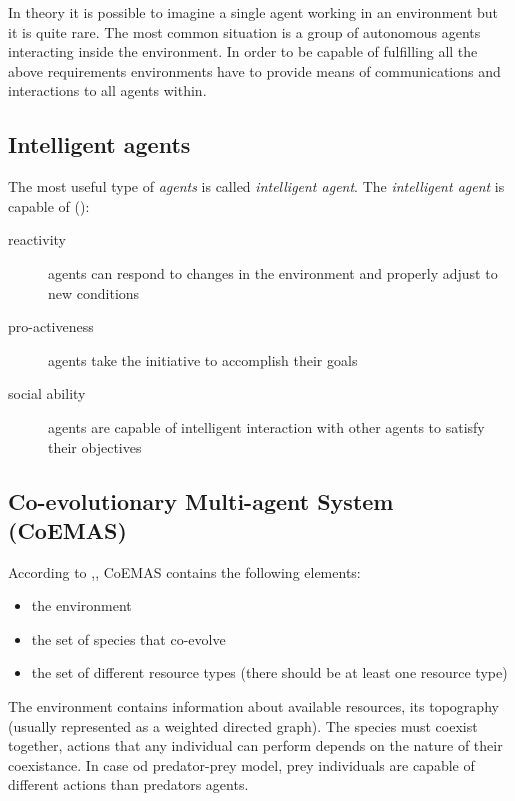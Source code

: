 In theory it is possible to imagine a single agent working in an environment but it is quite rare.
The most common situation is a group of autonomous agents interacting inside the environment.
In order to be capable of fulfilling all the above requirements environments have to provide means of communications and interactions to all agents within.

\subsection{Intelligent agents}

The most useful type of \emph{agents} is called \emph{intelligent agent}.
The \emph{intelligent agent} is capable of (\cite{Weiss}):

\begin{description}
  \item [reactivity]
	  agents can respond to changes in the environment and properly adjust to new conditions
  \item [pro-activeness]
	  agents take the initiative to accomplish their goals
  \item [social ability]
	  agents are capable of intelligent interaction with other agents to satisfy their objectives
\end{description}

\subsection{Co-evolutionary Multi-agent System (CoEMAS)}
\label{sec:CoEMAS}

According to  \cite{Dre} ,\cite{Dre2}, CoEMAS contains the following elements:

\begin{itemize}
  \item the environment 
  \item the set of species that co-evolve 
  \item the set of different resource types (there should be at least one resource type)
\end{itemize}

The environment contains information about available resources, its topography (usually represented as a weighted directed graph).
The species must coexist together, actions that any individual can perform depends on the nature of their coexistance.
In case od predator-prey model, prey individuals are capable of different actions than predators agents.



